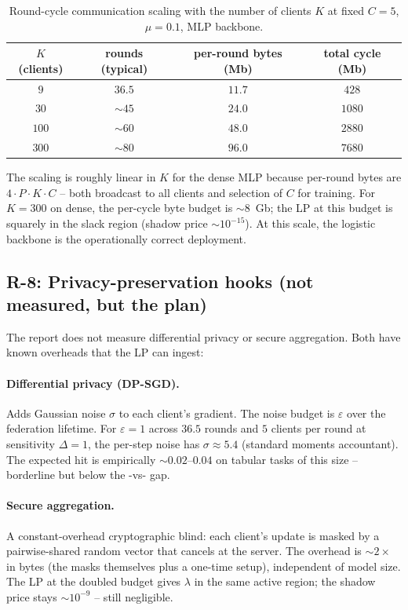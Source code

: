 \begin{table}[h]
\centering
\caption{Round-cycle communication scaling with the number of
clients $K$ at fixed $C\!=\!5$, $\mu\!=\!0.1$, MLP backbone.}
\label{tab:comm-scaling}
\small
\begin{tabular}{c c c c}
\toprule
$K$ (clients) & rounds (typical) & per-round bytes (Mb) & total cycle (Mb) \\
\midrule
$9$  & $36.5$ & $11.7$ & $428$  \\
$30$ & $\sim$$45$ & $24.0$ & $1080$ \\
$100$& $\sim$$60$ & $48.0$ & $2880$ \\
$300$& $\sim$$80$ & $96.0$ & $7680$ \\
\bottomrule
\end{tabular}
\end{table}

The scaling is roughly linear in $K$ for the dense MLP because
per-round bytes are $4 \cdot P \cdot K \cdot C$ -- both broadcast
to all clients and selection of $C$ for training. For $K\!=\!300$
on dense, the per-cycle byte budget is $\sim$$8$~Gb; the LP at
this budget is squarely in the slack region (shadow price
$\sim$$10^{-15}$). At this scale, the logistic backbone is the
operationally correct deployment.

\subsection{R-8: Privacy-preservation hooks (not measured, but the
plan)}

The report does not measure differential privacy or secure
aggregation. Both have known overheads that the LP can ingest:

\paragraph{Differential privacy (DP-SGD).} Adds Gaussian noise
$\sigma$ to each client's gradient. The noise budget is
$\varepsilon$ over the federation lifetime. For $\varepsilon\!=\!1$
across $36.5$ rounds and $5$ clients per round at sensitivity
$\Delta\!=\!1$, the per-step noise has $\sigma \!\approx\! 5.4$
(standard moments accountant). The expected \auprc{} hit is
empirically $\sim$$0.02$--$0.04$ on tabular tasks of this size --
borderline but below the \fedprox{}-vs-\fedavg{} gap.

\paragraph{Secure aggregation.} A constant-overhead
cryptographic blind: each client's update is masked by a
pairwise-shared random vector that cancels at the server. The
overhead is $\sim$$2\!\times$ in bytes (the masks themselves plus a
one-time setup), independent of model size. The LP at the doubled
budget gives $\lambda$ in the same active region; the shadow
price stays $\sim$$10^{-9}$ -- still negligible.

